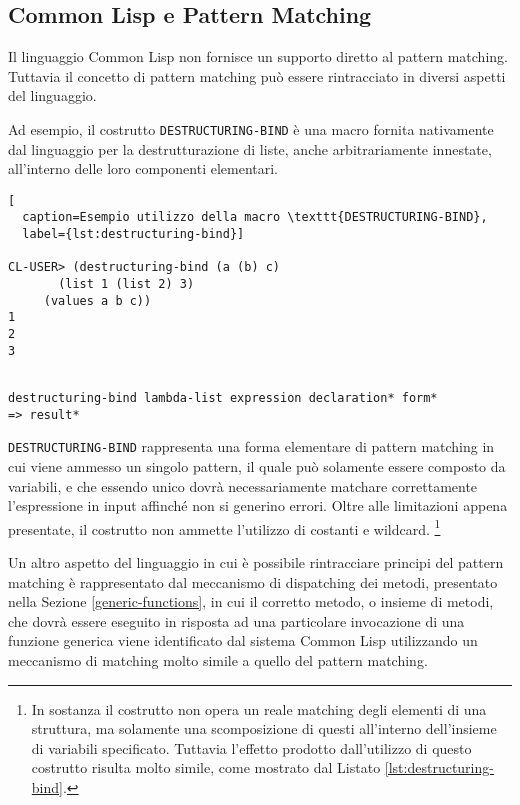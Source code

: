 \subsection{Common Lisp e Pattern Matching}

Il linguaggio Common Lisp non fornisce un supporto diretto al pattern matching.
Tuttavia il concetto di pattern matching può essere rintracciato in diversi
aspetti del linguaggio.

Ad esempio, il costrutto \texttt{DESTRUCTURING-BIND} è una macro fornita
nativamente dal linguaggio per la destrutturazione di liste, anche
arbitrariamente innestate, all’interno delle loro componenti elementari.

\begin{lstlisting}[
  caption=Esempio utilizzo della macro \texttt{DESTRUCTURING-BIND},
  label={lst:destructuring-bind}]

CL-USER> (destructuring-bind (a (b) c)
       (list 1 (list 2) 3)
     (values a b c))
1
2
3

\end{lstlisting}

\begin{lstlisting}[caption=Sintassi della macro \texttt{DESTRUCTURING-BIND}]

destructuring-bind lambda-list expression declaration* form*
=> result*

\end{lstlisting}

\texttt{DESTRUCTURING-BIND} rappresenta una forma elementare di pattern matching
in cui viene ammesso un singolo pattern, il quale può solamente essere composto
da variabili, e che essendo unico dovrà necessariamente matchare correttamente
l’espressione in input affinché non si generino errori. Oltre alle limitazioni
appena presentate, il costrutto non ammette l'utilizzo di costanti e wildcard.
\footnote{In sostanza il costrutto non opera un reale matching degli elementi di
una struttura, ma solamente una scomposizione di questi all'interno dell'insieme
di variabili specificato. Tuttavia l'effetto prodotto dall'utilizzo di questo
costrutto risulta molto simile, come mostrato dal Listato
\ref{lst:destructuring-bind}.}

Un altro aspetto del linguaggio in cui è possibile rintracciare principi del
pattern matching è rappresentato dal meccanismo di dispatching dei metodi,
presentato nella Sezione \ref{generic-functions}, in cui il corretto metodo, o
insieme di metodi, che dovrà essere eseguito in risposta ad una particolare
invocazione di una funzione generica viene identificato dal sistema Common Lisp
utilizzando un meccanismo di matching molto simile a quello del pattern
matching.\\

